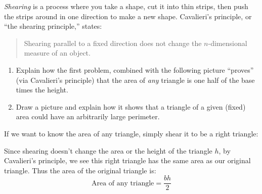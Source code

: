 \documentclass[nooutcomes,noauthor,handout,hints,12pt]{ximera}
\begin{document}
\begin{question}
  \emph{Shearing} is a process where you take a shape, cut it into thin strips, 
  then push the strips around in one direction to make a new shape.  
  Cavalieri's principle, or ``the shearing principle,'' states:
  \begin{quote}
    Shearing parallel to a fixed direction does not change the
    $n$-dimensional measure of an object.
  \end{quote}
 \begin{enumerate}
  \item Explain how the first problem, combined with the following
  picture ``proves'' (via Cavalieri's principle) that the area of \emph{any}
  triangle is one half of the base times the height.
  \begin{center}
  \end{center}
  \item Draw a picture and explain  how it shows that a triangle of a
    given (fixed) area could have an arbitrarily large perimeter. 
  \end{enumerate}
  
  \begin{freeResponse}
    If we want to know the area of any triangle, simply shear it to be a right triangle:
      \begin{center}
      \end{center}
    Since shearing doesn't change the area or the height of the
    triangle $h$, by Cavalieri's principle, we see this right triangle
    has the same area as our original triangle. Thus the area of the
    original triangle is:
    \[
    \text{Area of any triangle} = \frac{bh}{2}
    \]
  \end{freeResponse}
\end{question}
\mynewpage
\end{document}

